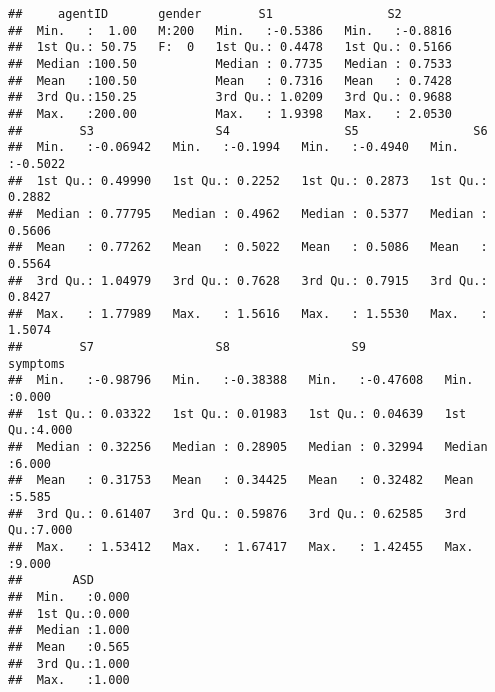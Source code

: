 \documentclass[]{article}
\newenvironment{Shaded}{\begin{snugshade}}{\end{snugshade}}
\newcommand{\KeywordTok}[1]{\textcolor[rgb]{0.13,0.29,0.53}{\textbf{#1}}}
\newcommand{\StringTok}[1]{\textcolor[rgb]{0.31,0.60,0.02}{#1}}
\newcommand{\CommentTok}[1]{\textcolor[rgb]{0.56,0.35,0.01}{\textit{#1}}}
\newcommand{\OperatorTok}[1]{\textcolor[rgb]{0.81,0.36,0.00}{\textbf{#1}}}
\newcommand{\AlertTok}[1]{\textcolor[rgb]{0.94,0.16,0.16}{#1}}
\newcommand{\NormalTok}[1]{#1}
\begin{document}
\begin{Shaded}
\end{Shaded}

\begin{verbatim}
##     agentID       gender        S1                S2         
##  Min.   :  1.00   M:200   Min.   :-0.5386   Min.   :-0.8816  
##  1st Qu.: 50.75   F:  0   1st Qu.: 0.4478   1st Qu.: 0.5166  
##  Median :100.50           Median : 0.7735   Median : 0.7533  
##  Mean   :100.50           Mean   : 0.7316   Mean   : 0.7428  
##  3rd Qu.:150.25           3rd Qu.: 1.0209   3rd Qu.: 0.9688  
##  Max.   :200.00           Max.   : 1.9398   Max.   : 2.0530  
##        S3                 S4                S5                S6         
##  Min.   :-0.06942   Min.   :-0.1994   Min.   :-0.4940   Min.   :-0.5022  
##  1st Qu.: 0.49990   1st Qu.: 0.2252   1st Qu.: 0.2873   1st Qu.: 0.2882  
##  Median : 0.77795   Median : 0.4962   Median : 0.5377   Median : 0.5606  
##  Mean   : 0.77262   Mean   : 0.5022   Mean   : 0.5086   Mean   : 0.5564  
##  3rd Qu.: 1.04979   3rd Qu.: 0.7628   3rd Qu.: 0.7915   3rd Qu.: 0.8427  
##  Max.   : 1.77989   Max.   : 1.5616   Max.   : 1.5530   Max.   : 1.5074  
##        S7                 S8                 S9              symptoms    
##  Min.   :-0.98796   Min.   :-0.38388   Min.   :-0.47608   Min.   :0.000  
##  1st Qu.: 0.03322   1st Qu.: 0.01983   1st Qu.: 0.04639   1st Qu.:4.000  
##  Median : 0.32256   Median : 0.28905   Median : 0.32994   Median :6.000  
##  Mean   : 0.31753   Mean   : 0.34425   Mean   : 0.32482   Mean   :5.585  
##  3rd Qu.: 0.61407   3rd Qu.: 0.59876   3rd Qu.: 0.62585   3rd Qu.:7.000  
##  Max.   : 1.53412   Max.   : 1.67417   Max.   : 1.42455   Max.   :9.000  
##       ASD       
##  Min.   :0.000  
##  1st Qu.:0.000  
##  Median :1.000  
##  Mean   :0.565  
##  3rd Qu.:1.000  
##  Max.   :1.000
\end{verbatim}
\end{document}
